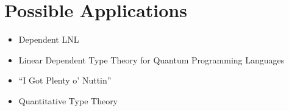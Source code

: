 \documentclass[12pt,letterpaper,oneside,article]{memoir}
\begin{document}
\chapter{Possible Applications}
\begin{itemize}
\item Dependent LNL~\cite{Krishnaswami:POPL15}
\item Linear Dependent Type Theory for Quantum Programming
  Languages~\cite{Fu:LMCS22}
\item ``I Got Plenty o' Nuttin''~\cite{McBride:LNCS16}
\item Quantitative Type Theory~\cite{Atkey:LICS18}
\end{itemize}


\end{document}
